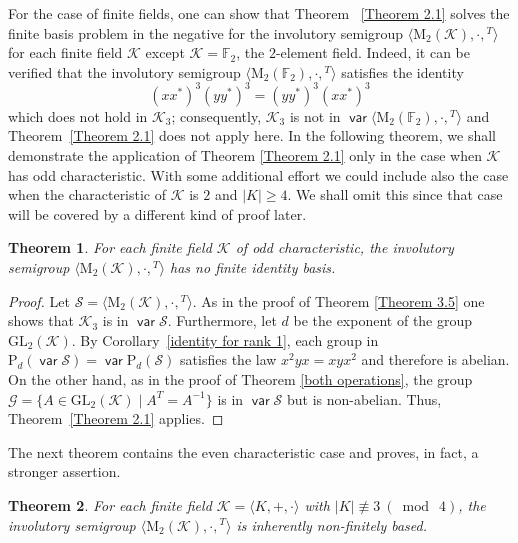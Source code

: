 \documentclass[11pt,reqno]{amsart}
\DeclareMathOperator{\var}{\mathsf{var}}
\numberwithin{equation}{section}
\def\bb{\mathbb}
\newtheorem{Thm}{Theorem}[section]
\theoremstyle{remark}
\def\cal{\mathcal}
\def\Sc{{\cal S}}
\def\P{\mathrm P\!}
\begin{document}
For the case of finite fields, one can show that Theorem
~\ref{Theorem 2.1} solves the finite basis problem in the negative
for the involutory semigroup
$\langle\mathrm{M}_2(\mathcal{K}),\cdot,{}^T\rangle$ for each
finite field $\mathcal{K}$ except $\mathcal{K}=\mathbb{F}_2$, the
$2$-element field. Indeed, it can be verified that the involutory
semigroup $\langle\mathrm{M}_2(\bb F_2),\cdot,{}^T\rangle$
satisfies the identity
$$(xx^*)^3(yy^*)^3=(yy^*)^3(xx^*)^3$$
which does not hold in $\mathcal{K}_3$; consequently,
$\mathcal{K}_3$ is not in $\var\langle\mathrm{M}_2(\bb
F_2),\cdot,{}^T\rangle$ and Theorem~\ref{Theorem 2.1} does not
apply here. In the following theorem, we shall  demonstrate the
application of Theorem \ref{Theorem 2.1} only in the case when
$\mathcal{K}$ has odd characteristic. With some additional effort
we could include also the case when the characteristic of
$\mathcal{K}$ is $2$ and $\vert K\vert\ge 4$. We shall omit this
since that case will be covered by a different kind of proof
later.

\begin{Thm}\label{Theorem 3.6}
For each finite field $\mathcal{K}$ of odd characteristic, the
involutory semigroup
$\langle\mathrm{M}_2(\mathcal{K}),\cdot,{}^T\rangle$ has no finite
identity basis.
\end{Thm}

\begin{proof}
Let $\Sc=\langle\mathrm{M}_2(\mathcal{K}),\cdot,{}^T\rangle$. As
in the proof of Theorem \ref{Theorem 3.5} one shows that
$\mathcal{K}_3$ is in $\var\Sc$.  Furthermore, let $d$ be the
exponent of the group $\mathrm{GL}_2(\mathcal{K})$.  By
Corollary~\ref{identity for rank 1}, each group in
$\P_d(\var\Sc)=\var\P_d(\Sc)$ satisfies the law $x^2yx=xyx^2$ and
therefore is abelian. On the other hand, as in the proof of
Theorem \ref{both operations}, the group $\mathcal{G}=\{A\in
\mathrm{GL}_2(\mathcal{K})\mid A^T=A^{-1}\}$ is in $\var\Sc$ but
is non-abelian. Thus, Theorem~\ref{Theorem 2.1} applies.
\end{proof}

The next theorem contains the even characteristic case and proves,
in fact, a stronger assertion.

\begin{Thm}\label{inherently degree 2}
For each finite field $\mathcal{K}=\langle K,+,\cdot\rangle$ with
$\vert K\vert\mathrel{\not\equiv} 3\ (\bmod\ 4)$, the involutory
semigroup $\langle\mathrm{M}_2(\mathcal{K}),\cdot,{}^T\rangle$ is
inherently non-finitely based.
\end{Thm}
\end{document}
